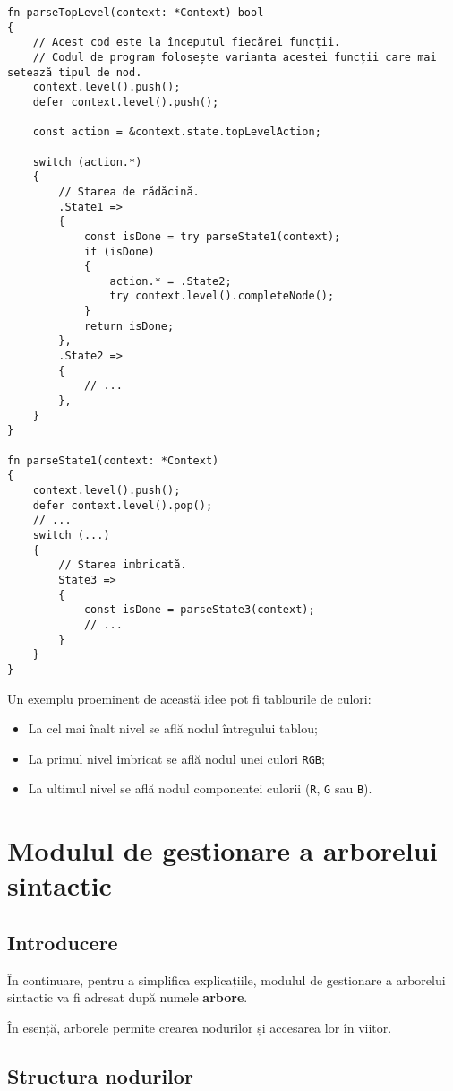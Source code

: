 \documentclass[a4paper,12pt]{report}
\begin{document}
\begin{verbatim}
fn parseTopLevel(context: *Context) bool
{
    // Acest cod este la începutul fiecărei funcții.
    // Codul de program folosește varianta acestei funcții care mai setează tipul de nod.
    context.level().push();
    defer context.level().push();

    const action = &context.state.topLevelAction;

    switch (action.*)
    {
        // Starea de rădăcină.
        .State1 =>
        {
            const isDone = try parseState1(context);
            if (isDone)
            {
                action.* = .State2;
                try context.level().completeNode();
            }
            return isDone;
        },
        .State2 =>
        {
            // ...
        },
    }
}

fn parseState1(context: *Context)
{
    context.level().push();
    defer context.level().pop();
    // ...
    switch (...)
    {
        // Starea imbricată.
        State3 =>
        {
            const isDone = parseState3(context);
            // ...
        }
    }
}
\end{verbatim}

Un exemplu proeminent de această idee pot fi tablourile de culori:
\begin{itemize}
    \item La cel mai înalt nivel se află nodul întregului tablou;
    \item La primul nivel imbricat se află nodul unei culori \texttt{\ac{RGB}};
    \item La ultimul nivel se află nodul componentei culorii (\texttt{R}, \texttt{G} sau \texttt{B}).
\end{itemize}


\section{Modulul de gestionare a arborelui sintactic}

\subsection{Introducere}

În continuare, pentru a simplifica explicațiile,
modulul de gestionare a arborelui sintactic va fi adresat după numele \textbf{arbore}.

În esență, arborele permite crearea nodurilor și accesarea lor în viitor.

\subsection{Structura nodurilor}
\end{document}
